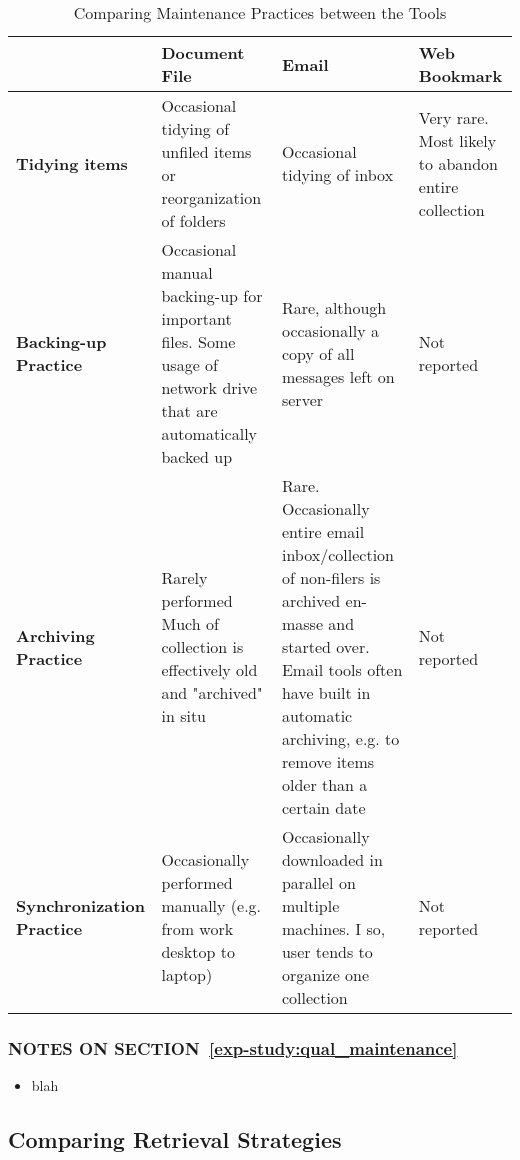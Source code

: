\begin{table}[h]
\begin{center}
\begin{footnotesize}
\begin{tabular}{|p{2.5cm}|p{3.5cm}|p{3.5cm}|p{3.5cm}|}
\hline
& {\bf Document File} & {\bf Email} & {\bf Web Bookmark} \\
\hline \hline
{\bf Tidying items} & Occasional tidying of unfiled items or reorganization of folders & Occasional tidying of inbox & Very rare. Most likely to abandon entire collection \\
\hline
{\bf Backing-up Practice} & Occasional manual backing-up for important files. Some usage of network drive that are automatically backed up & Rare, although occasionally a copy of all messages left on server & Not reported \\
\hline
{\bf Archiving Practice} & Rarely performed Much of collection is effectively old and "archived" in situ & Rare. Occasionally entire email inbox/collection of non-filers is archived en-masse and started over. Email tools often have built in automatic archiving, e.g. to remove items older than a certain date & Not reported \\
\hline
{\bf Synchronization Practice} & Occasionally performed manually (e.g. from work desktop to laptop) & Occasionally downloaded in parallel on multiple machines. I so, user tends to organize one collection & Not reported \\
\hline
\end{tabular}  
\end{footnotesize}
\caption{Comparing Maintenance Practices between the Tools}
\label{table:chapter3_maintenance_strategy}
\end{center}
\end{table}



\noindent
\subsubsection*{NOTES ON SECTION~\ref{exp-study:qual_maintenance}}
\begin{itemize}
\item blah
\end{itemize}






\newpage
\subsection{Comparing Retrieval Strategies}
\label{exp-study:qual_retrieval}

